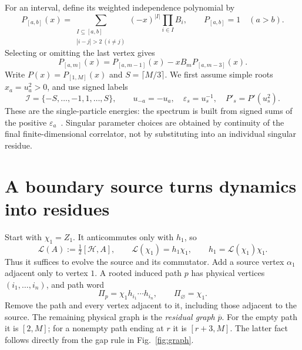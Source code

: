 \documentclass[11pt,a4paper]{article}
\newcommand{\HH}{\mathcal H}
\newcommand{\LL}{\mathcal L}
\newcommand{\eps}{\varepsilon}
\newcommand{\Sig}{\mathcal I}
\newcommand{\PP}[1]{P_{[#1]}}
\begin{document}
For an interval, define its weighted independence polynomial by
\begin{equation}
 \PP{a,b}(x)=\sum_{\substack{I\subseteq[a,b]\\ |i-j|>2\ (i\ne j)}}
 (-x)^{|I|}\prod_{i\in I}B_i,\qquad \PP{a,b}=1\quad(a>b).
 \label{eq:Pdef}
\end{equation}
Selecting or omitting the last vertex gives
\begin{equation}
 \PP{a,m}(x)=\PP{a,m-1}(x)-xB_m\PP{a,m-3}(x).
 \label{eq:Prec}
\end{equation}
Write $P(x)=\PP{1,M}(x)$ and $S=\lceil M/3\rceil$. We first assume simple roots $x_a=u_a^2>0$, and use signed labels
\begin{equation}
 \Sig=\{-S,\ldots,-1,1,\ldots,S\},\qquad
 u_{-a}=-u_a,\quad \eps_s=u_s^{-1},\quad P'_s=P'(u_s^2).
 \label{eq:roots}
\end{equation}
These are the single-particle energies: the spectrum is built from signed sums of the positive $\eps_a$~\cite{Fendley,Elman}. Singular parameter choices are obtained by continuity of the final finite-dimensional correlator, not by substituting into an individual singular residue.

\section{A boundary source turns dynamics into residues}
Start with $\chi_1=Z_1$. It anticommutes only with $h_1$, so
\begin{equation}
 \LL(A):=\tfrac12[\HH,A],\qquad
 \LL(\chi_1)=h_1\chi_1,\qquad h_1=\LL(\chi_1)\chi_1.
 \label{eq:source}
\end{equation}
Thus it suffices to evolve the source and its commutator. Add a source vertex $\alpha_1$ adjacent only to vertex $1$. A rooted induced path $p$ has physical vertices $(i_1,\ldots,i_n)$, and path word
\begin{equation}
 \Pi_p=\chi_1h_{i_1}\cdots h_{i_n},\qquad \Pi_{\varnothing}=\chi_1.
\end{equation}
Remove the path and every vertex adjacent to it, including those adjacent to the source. The remaining physical graph is the \emph{residual graph} $\overline p$. For the empty path it is $[2,M]$; for a nonempty path ending at $r$ it is $[r+3,M]$. The latter fact follows directly from the gap rule in Fig.~\ref{fig:graph}.
\end{document}
